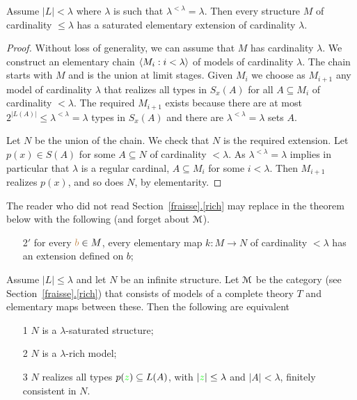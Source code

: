 \documentclass[creche.tex]{subfiles}
\begin{document}
\begin{theorem}\label{thm_esistenza_staturo_card_inacc}
Assume $|L|<\lambda$ where $\lambda$ is such that $\lambda^{<\lambda}=\lambda$. Then every structure $M$ of cardinality $\le\lambda$ has a saturated elementary extension of cardinality $\lambda$.
\end{theorem}

\begin{proof}
Without loss of generality, we can assume that $M$ has cardinality $\lambda$. We construct an elementary chain $\langle M_i : i<\lambda\rangle$ of models of cardinality $\lambda$. The chain starts with $M$ and is the union at limit stages. Given $M_i$ we choose as $M_{i+1}$ any model of cardinality $\lambda$ that realizes all types in $S_x(A)$ for all $A\subseteq M_i$ of cardinality $<\lambda$. The required $M_{i+1}$ exists because there are at most $2^{|L(A)|}\le\lambda^{<\lambda}=\lambda$ types in $S_x(A)$ and there are $\lambda^{<\lambda}=\lambda$ sets $A$.

Let $N$ be the union of the chain. We check that $N$ is the required extension. Let $p(x)\in S(A)$ for some $A\subseteq N$ of cardinality $<\lambda$. As $\lambda^{<\lambda}=\lambda$ implies in particular that $\lambda$ is a regular cardinal,  $A\subseteq M_i$ for some $i<\lambda$. Then $M_{i+1}$ realizes $p(x)$, and so does $N$, by elementarity.
\end{proof}

\begin{remark}
The reader who did not read Section~\hyperref[rich]{\ref*{fraisse}.\ref*{rich}} may replace  in the theorem below with the following (and forget about $\EuScript M$).
\begin{itemize}
\item[2$'$] for every ${\color{brown} b}\in M$,  every elementary map $k:M\to N$ of cardinality $<\lambda$ has an extension defined on $b$;
\end{itemize}
\end{remark}


\begin{theorem}\label{saturo->ricco}
Assume $|L|\le\lambda$ and let $N$ be an infinite structure. Let $\EuScript M$ be the category (see Section~\hyperref[rich]{\ref*{fraisse}.\ref*{rich}}) that consists of models of a complete theory $T$ and elementary maps between these. Then the following are equivalent
\begin{itemize}
\item[1] $N$ is a $\lambda$-saturated structure;
\item[2] $N$ is a $\lambda$-rich model;
\item[3] $N$ realizes all types $p({\color{green} z})\subseteq L(A)$, with $|{\color{green} z}|\le\lambda$ and $|A|<\lambda$, finitely consistent in $N$.
\end{itemize}
\end{theorem}
\end{document}
